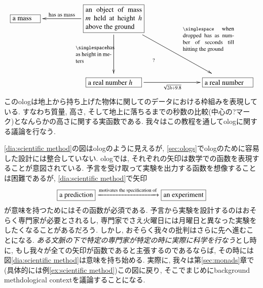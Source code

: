 \[
\xymatrix{
\obox{}{.5in}{a mass}&&\obox{}{1.1in}{an object of mass $m$ held at height $h$ above the ground}\LAL{ll}{\footnotesize has as mass}\LA{rrdd}{\hspace{.4in}\parbox{1in}{\singlespace \footnotesize when dropped has as number of seconds till hitting the ground}}\LAL{dd}{\parbox{.7in}{\singlespace\footnotesize has as height in meters}}&&\\\\
&&\obox{}{1in}{a real number $h$}\ar@{}[uurr]|(.35){?}\ar[rr]_-{\sqrt{2h\div 9.8}}&\hspace{.3in}&\obox{}{.9in}{a real number}
}
\]
このologは地上から持ち上げた物体に関してのデータにおける枠組みを表現している. すなわち質量, 高さ, そして地上に落ちるまでの秒数の比較(中心の?マーク)となんらかの高さに関する実函数である.
我々はこの教程を通してologに関する議論を行なう.


\eqref{dia:scientific method}の図はologのように見えるが, \ref{sec:ologs}でologのために容易した設計には整合していない. ologでは, それぞれの矢印は数学での函数を表現することが意図されている. 予言を受け取って実験を出力する函数を想像することは困難であるが, \eqref{dia:scientific method}で矢印
\[
\fbox{a prediction}\xrightarrow{\textrm{motivates the specification of}}\fbox{an experiment}
\]
が意味を持つためにはその函数が必須である. 予言から実験を設計するのはおそらく専門家が必要とされるし, 専門家でさえ火曜日には月曜日と異なった実験をしたくなることがあるだろう. しかし, おそらく我々の批判はさらに先へ進むことになる. \emph{ある文脈の下で特定の専門家が特定の時に実際に科学を行なう}とし時に, もし我々が全ての矢印が函数であると主張するのであるならば, その時には図\eqref{dia:scientific method}は意味を持ち始める. 実際に, 我々は第\ref{sec:monads}章で(具体的には例\ref{ex:scientific method})この図に戻り, そこでまじめにbackground methdological contextを議論することになる.

